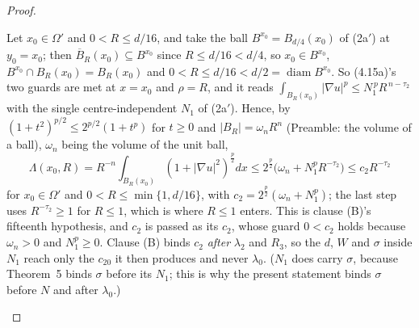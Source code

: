 \begin{proof}
\begin{enumerate}
  Let $x_0\in\Omega'$ and $0<R\le d/16$, and take the ball
  $B^{x_0}=B_{d/4}(x_0)$ of (2a$'$) at $y_0=x_0$; then
  $\overline B_R(x_0)\subseteq B^{x_0}$ since $R\le d/16<d/4$, so
  $x_0\in B^{x_0}$, $B^{x_0}\cap B_R(x_0)=B_R(x_0)$ and
  $0<R\le d/16<d/2=\operatorname{diam}B^{x_0}$.  So (4.15a)'s two guards are met
  at $x=x_0$ and $\rho=R$, and it reads
  $\int_{B_R(x_0)}|\nabla u|^p\le N_1^{\,p}R^{\,n-\tau_2}$ with the single
  centre-independent $N_1$ of (2a$'$).  Hence, by
  $(1+t^2)^{p/2}\le2^{p/2}(1+t^p)$ for $t\ge0$ and $|B_R|=\omega_nR^n$
  (Preamble: the volume of a ball), $\omega_n$ being the volume of the unit
  ball,
  \[
  \Lambda(x_0,R)=R^{-n}\!\int_{B_R(x_0)}(1+|\nabla u|^2)^{\frac p2}dx
  \le2^{\frac p2}\bigl(\omega_n+N_1^pR^{-\tau_2}\bigr)\le c_2R^{-\tau_2}
  \]
  for $x_0\in\Omega'$ and $0<R\le\min\{1,d/16\}$, with
  $c_2=2^{\frac p2}(\omega_n+N_1^p)$; the last step uses $R^{-\tau_2}\ge1$ for
  $R\le1$, which is where $R\le1$ enters.  This is clause
  (B)'s fifteenth hypothesis, and $c_2$ is passed as its $c_2$, whose guard
  $0<c_2$ holds because $\omega_n>0$ and $N_1^p\ge0$.  Clause (B) binds $c_2$
  \emph{after} $\lambda_2$ and $R_3$, so the $d$, $W$ and $\sigma$ inside $N_1$
  reach only the $c_{20}$ it then produces and never $\lambda_0$.  ($N_1$ does
  carry $\sigma$,
  because Theorem~5 binds $\sigma$ before its $N_1$; this is why the present
  statement binds $\sigma$ before $N$ and after $\lambda_0$.)


\end{enumerate}
\end{proof}
